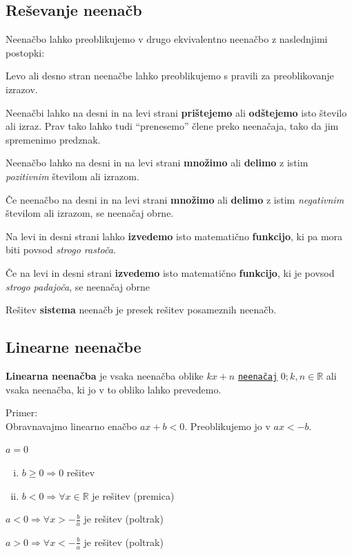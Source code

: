 \documentclass[a4paper,oneside,12pt,fleqn]{article}
\def\R{\ensuremath{\mathbb R}}
\renewcommand\implies\Rightarrow
\numberwithin{equation}{section}
\newenvironment{itemize*}%
{
\vspace{-12pt}%
\begin{itemize}%
\setlength{\itemsep}{0pt}%
\setlength{\parskip}{2pt}}%
{\end{itemize}}
\newenvironment{enumerate*}%
{
\vspace{-12pt}%
\begin{enumerate}%
\setlength{\itemsep}{0pt}%
\setlength{\parskip}{2pt}}%
{\end{enumerate}}
\begin{document}
\subsection{Reševanje neenačb}
\label{sec:neenac:resev}
Neenačbo lahko preoblikujemo v drugo ekvivalentno neenačbo z naslednjimi postopki:
\begin{itemize*}
  \item Levo ali desno stran neenačbe lahko preoblikujemo s pravili za preoblikovanje
    izrazov.
  \item Neenačbi lahko na desni in na levi strani \textbf{prištejemo} ali \textbf{odštejemo} isto število ali izraz.
Prav tako lahko tudi ``prenesemo'' člene preko neenačaja, tako da jim spremenimo predznak.

  \item Neenačbo lahko na desni in na levi strani \textbf{množimo} ali \textbf{delimo} z istim \textit{pozitivnim} številom
ali izrazom.

  \item Če neenačbo na desni in na levi strani \textbf{množimo} ali \textbf{delimo} z istim \textit{negativnim} številom
ali izrazom, se neenačaj obrne.

  \item Na levi in desni strani lahko \textbf{izvedemo} isto matematično \textbf{funkcijo}, ki pa mora biti povsod 
\textit{strogo rastoča}.

  \item Če na levi in desni strani \textbf{izvedemo} isto matematično \textbf{funkcijo}, ki je povsod \textit{strogo
padajoča}, se neenačaj obrne
\end{itemize*}

Rešitev \textbf{sistema} neenačb je presek rešitev posameznih neenačb.

\subsection{Linearne neenačbe}
\label{sec:neenac:lin}
\textbf{Linearna neenačba} je vsaka neenačba oblike $kx + n$
\hyperlink{point:neenacaj}{\texttt{neenačaj}} $0; k, n \in \R$ ali vsaka
neenačba, ki jo v to obliko lahko prevedemo.

Primer:\\
Obravnavajmo linearno enačbo $ax+b<0$.
Preoblikujemo jo v $ax<-b$.
\begin{enumerate*}
  \item $a = 0$
    \begin{enumerate}[i.]
      \item $b \ge 0 \implies 0$ rešitev
      \item $b < 0 \implies \forall x \in \R$ je rešitev (premica)
    \end{enumerate}
  \item $a < 0 \implies \forall x > -\frac{b}{a}$ je rešitev (poltrak)
  \item $a > 0 \implies \forall x < -\frac{b}{a}$ je rešitev (poltrak)
\end{enumerate*}
\end{document}
